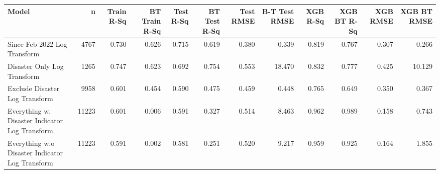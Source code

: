 
\begin{tabular}{l|r|r|r|r|r|r|r|r|r|r|r}
\hline
Model & n & Train R-Sq & BT Train R-Sq & Test R-Sq & BT Test R-Sq & Test RMSE & B-T Test RMSE & XGB R-Sq & XGB BT R-Sq & XGB RMSE & XGB BT RMSE\\
\hline
Since Feb 2022 Log Transform & 4767 & 0.730 & 0.626 & 0.715 & 0.619 & 0.380 & 0.339 & 0.819 & 0.767 & 0.307 & 0.266\\
\hline
Disaster Only Log Transform & 1265 & 0.747 & 0.623 & 0.692 & 0.754 & 0.553 & 18.470 & 0.832 & 0.777 & 0.425 & 10.129\\
\hline
Exclude Disaster Log Transform & 9958 & 0.601 & 0.454 & 0.590 & 0.475 & 0.459 & 0.448 & 0.765 & 0.649 & 0.350 & 0.367\\
\hline
Everything w. Disaster Indicator Log Transform & 11223 & 0.601 & 0.006 & 0.591 & 0.327 & 0.514 & 8.463 & 0.962 & 0.989 & 0.158 & 0.743\\
\hline
Everything w.o Disaster Indicator Log Transform & 11223 & 0.591 & 0.002 & 0.581 & 0.251 & 0.520 & 9.217 & 0.959 & 0.925 & 0.164 & 1.855\\
\hline
\end{tabular}
